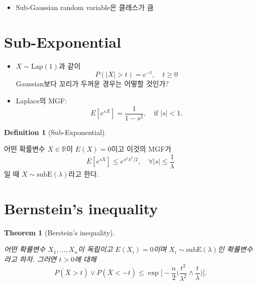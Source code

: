 \documentclass[
  letterpaper,
  DIV=11,
  numbers=noendperiod]{scrreprt}
\providecommand{\tightlist}{%
  \setlength{\itemsep}{0pt}\setlength{\parskip}{0pt}}\usepackage{longtable,booktabs,array}
\theoremstyle{plain}
\newtheorem{theorem}{Theorem}[chapter]
\theoremstyle{definition}
\theoremstyle{definition}
\newtheorem{definition}{Definition}[chapter]
\theoremstyle{plain}
\theoremstyle{plain}
\theoremstyle{remark}
\begin{document}
\begin{tcolorbox}[enhanced jigsaw, opacityback=0, colframe=quarto-callout-note-color-frame, breakable, left=2mm, arc=.35mm, rightrule=.15mm, titlerule=0mm, coltitle=black, title=\textcolor{quarto-callout-note-color}{\faInfo}\hspace{0.5em}{Remark}, colbacktitle=quarto-callout-note-color!10!white, toptitle=1mm, bottomtitle=1mm, leftrule=.75mm, toprule=.15mm, colback=white, opacitybacktitle=0.6, bottomrule=.15mm]

\begin{itemize}
\tightlist
\item
  Sub-Gaussian random variable은 클래스가 큼
\end{itemize}

\end{tcolorbox}

\section{Sub-Exponential}\label{sub-exponential}

\begin{itemize}
\item
  \(X\sim \text{Lap}(1)\)과 같이 \[
  P(|X|>t)=e^{-t},\quad{} t\geq 0
  \] Gaussian보다 꼬리가 두꺼운 경우는 어떻할 것인가?
\item
  Laplace의 MGF: \[
  E[e^{sX}] = \frac{1}{1-s^2},\quad{} \text{if } |s|<1.
  \]
\end{itemize}

\begin{definition}[Sub-Exponential]\protect\hypertarget{def-subexponential}{}\label{def-subexponential}

어떤 확률변수 \(X\in \mathbb{R}\)이 \(E(X)=0\)이고 이것의 MGF가 \[
E[e^{sX}] \leq e^{s^2 \lambda^2 / 2}, \quad{} \forall |s| \leq \frac{1}{\lambda}
\] 일 때 \(X \sim \text{subE}(\lambda)\)라고 한다.

\end{definition}

\section{Bernstein's inequality}\label{bernsteins-inequality}

\begin{theorem}[Berstein's
inequality]\protect\hypertarget{thm-bersteinineq}{}\label{thm-bersteinineq}

어떤 확률변수 \(X_1, \ldots, X_n\)이 독립이고 \(E(X_i) = 0\)이며
\(X_i \sim \text{subE}(\lambda)\)인 확률변수라고 하자. 그러면 \(t>0\)에
대해 \[
P(\overline{X} >t) \vee P(\overline{X} < -t) \leq \exp \Big[ - \frac{n}{2}\Big(\frac{t^2}{\lambda^2}\wedge \frac{t}{\lambda} \Big) \Big] .
\]

\end{theorem}
\end{document}
